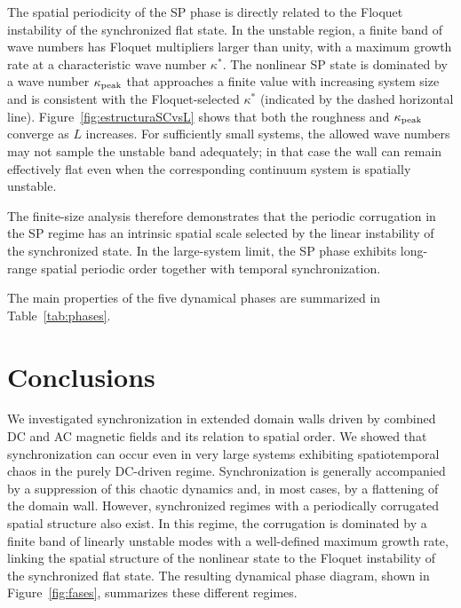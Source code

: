 \documentclass[prb,aps,twocolumn,superscriptaddress,floatfix]{revtex4-1}
\begin{document}
The spatial periodicity of the SP phase is directly related to the Floquet instability of the synchronized flat state. In the unstable region, a finite band of wave numbers has Floquet multipliers larger than unity, with a maximum growth rate at a characteristic wave number $\kappa^*$. The nonlinear SP state is dominated by a wave number $\kappa_{\rm peak}$ that approaches a finite value with increasing system size and is consistent with the Floquet-selected $\kappa^*$ (indicated by the dashed horizontal line). Figure~\ref{fig:estructuraSCvsL} shows that both the roughness and $\kappa_{\rm peak}$ converge as $L$ increases. For sufficiently small systems, the allowed wave numbers may not sample the unstable band adequately; in that case the wall can remain effectively flat even when the corresponding continuum system is spatially unstable.

The finite-size analysis therefore demonstrates that the periodic corrugation in the SP regime has an intrinsic spatial scale selected by the linear instability of the synchronized state. In the large-system limit, the SP phase exhibits long-range spatial periodic order together with temporal synchronization.

The main properties of the five dynamical phases are summarized in Table~\ref{tab:phases}.















\section{Conclusions}\label{sec:conclusions}
We investigated synchronization in extended domain walls driven by combined DC and AC magnetic fields and its relation to spatial order. We showed that synchronization can occur even in very large systems exhibiting spatiotemporal chaos in the purely DC-driven regime. Synchronization is generally accompanied by a suppression of this chaotic dynamics and, in most cases, by a flattening of the domain wall. However, synchronized regimes with a periodically corrugated spatial structure also exist. In this regime, the corrugation is dominated by a finite band of linearly unstable modes with a well-defined maximum growth rate, linking the spatial structure of the nonlinear state to the Floquet instability of the synchronized flat state. The resulting dynamical phase diagram, shown in Figure~\ref{fig:fases}, summarizes these different regimes.
\end{document}
